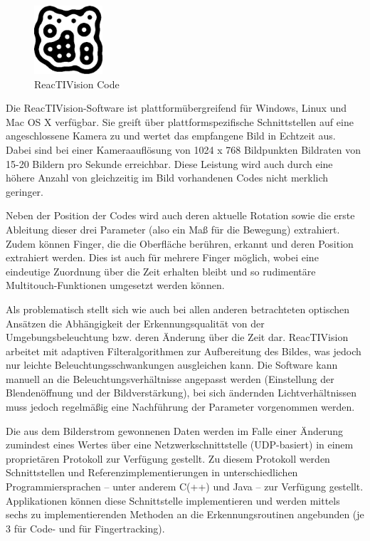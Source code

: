 \begin{figure}[htbp]
	\centering
		\includegraphics[height=1in]{img/ImplementierungInput/ReactivisionCode.png}
	\caption{ReacTIVision Code}
	\label{fig:img_ImplementierungInput_ReactivisionCode}
\end{figure}

Die ReacTIVision-Software ist plattformübergreifend für Windows, Linux und Mac OS X verfügbar. Sie greift über plattformspezifische Schnittstellen auf eine angeschlossene Kamera zu und wertet das empfangene Bild in Echtzeit aus. Dabei sind bei einer Kameraauflösung von 1024 x 768 Bildpunkten Bildraten von 15-20 Bildern pro Sekunde erreichbar. Diese Leistung wird auch durch eine höhere Anzahl von gleichzeitig im Bild vorhandenen Codes nicht merklich geringer.

Neben der Position der Codes wird auch deren aktuelle Rotation sowie die erste Ableitung dieser drei Parameter (also ein Maß für die Bewegung) extrahiert. Zudem können Finger, die die Oberfläche berühren, erkannt und deren Position extrahiert werden. Dies ist auch für mehrere Finger möglich, wobei eine eindeutige Zuordnung über die Zeit erhalten bleibt und so rudimentäre Multitouch-Funktionen umgesetzt werden können.

Als problematisch stellt sich wie auch bei allen anderen betrachteten optischen Ansätzen die Abhängigkeit der Erkennungsqualität von der Umgebungsbeleuchtung bzw. deren Änderung über die Zeit dar. ReacTIVision arbeitet mit adaptiven Filteralgorithmen zur Aufbereitung des Bildes, was jedoch nur leichte Beleuchtungsschwankungen ausgleichen kann. Die Software kann manuell an die Beleuchtungsverhältnisse angepasst werden (Einstellung der Blendenöffnung und der Bildverstärkung), bei sich ändernden Lichtverhältnissen muss jedoch regelmäßig eine Nachführung der Parameter vorgenommen werden.

Die aus dem Bilderstrom gewonnenen Daten werden im Falle einer Änderung zumindest eines Wertes über eine Netzwerkschnittstelle (UDP-basiert) in einem proprietären Protokoll zur Verfügung gestellt. Zu diesem Protokoll werden Schnittstellen und Referenzimplementierungen in unterschiedlichen Programmiersprachen -- unter anderem C(++) und Java -- zur Verfügung gestellt. Applikationen können diese Schnittstelle implementieren und werden mittels sechs zu implementierenden Methoden an die Erkennungsroutinen angebunden (je 3 für Code- und für Fingertracking).

